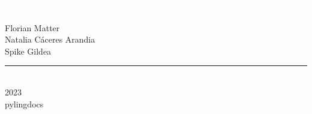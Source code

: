 \begin{titlingpage}
\BgThispage
{}
\vspace*{2cm}
\centering
\textcolor{white}{ \hugefont A digital sketch grammar of Yawarana }
\vspace*{3cm}\par
\noindent
{
\raggedleft
\begin{minipage}{0.90\linewidth}
    \begin{flushright}
        
{\Huge Florian Matter }\\[\baselineskip]

{\Huge Natalia Cáceres Arandia }\\[\baselineskip]

{\Huge Spike Gildea }\\[\baselineskip]

    \end{flushright}
\end{minipage} \hspace{15pt}
}
\centering
\vfill
\rule{0.4\textwidth}{0.4pt}\\
{\Huge 2023 \\ \large pylingdocs }
\end{titlingpage}
